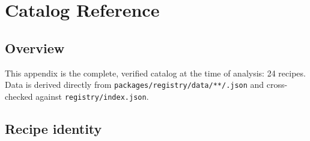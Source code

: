 \chapter{Catalog Reference}
\label{app:catalog}

\section{Overview}

This appendix is the complete, verified catalog at the time of analysis: 24
recipes. Data is derived directly from
\texttt{packages/registry/data/**/\allowbreak*.json} and cross-checked against
\texttt{registry/index.json}.

\section{Recipe identity}

